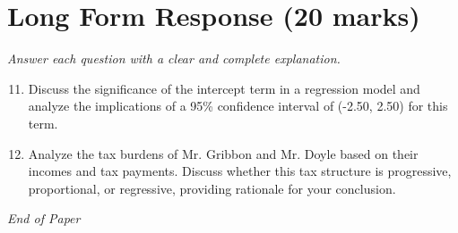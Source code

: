 \documentclass[12pt]{article}
\begin{document}
\section*{Long Form Response (20 marks)}
\textit{Answer each question with a clear and complete explanation.}
\begin{enumerate}[label=\arabic*.]
\setcounter{enumi}{10}
\item Discuss the significance of the intercept term in a regression model and analyze the
implications of a 95\% confidence interval of (-2.50, 2.50) for this term.
\item Analyze the tax burdens of Mr. Gribbon and Mr. Doyle based on their incomes and tax
payments. Discuss whether this tax structure is progressive, proportional, or regressive,
providing rationale for your conclusion.
\end{enumerate}

\vfill
\noindent\textit{End of Paper}
\end{document}
